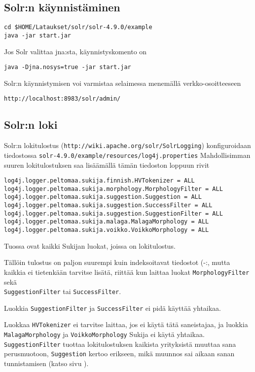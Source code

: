 \documentclass[12pt,a4paper]{scrartcl}
\begin{document}
\subsection*{Solr:n käynnistäminen}

\begin{verbatim}
cd $HOME/Lataukset/solr/solr-4.9.0/example
java -jar start.jar
\end{verbatim}

Jos Solr valittaa jna:sta, käynnistyskomento on

\begin{verbatim}
java -Djna.nosys=true -jar start.jar
\end{verbatim}

Solr:n käynnistymisen voi varmistaa selaimessa menemällä verkko-osoitteeseen

\verb|http://localhost:8983/solr/admin/|


\subsection*{Solr:n loki}

Solr:n lokitulostus (\verb=http://wiki.apache.org/solr/SolrLogging=)
konfiguroidaan tiedostossa
\verb=solr-4.9.0/example/resources/log4j.properties=
Mahdollisimman suuren lokitulostuksen saa lisäämällä tämän tiedoston
loppuun rivit

\begin{verbatim}
log4j.logger.peltomaa.sukija.finnish.HVTokenizer = ALL
log4j.logger.peltomaa.sukija.morphology.MorphologyFilter = ALL
log4j.logger.peltomaa.sukija.suggestion.Suggestion = ALL
log4j.logger.peltomaa.sukija.suggestion.SuccessFilter = ALL
log4j.logger.peltomaa.sukija.suggestion.SuggestionFilter = ALL
log4j.logger.peltomaa.sukija.malaga.MalagaMorphology = ALL
log4j.logger.peltomaa.sukija.voikko.VoikkoMorphology = ALL
\end{verbatim}

Tuossa ovat kaikki Sukijan luokat, joissa on lokitulostus.

Tällöin tulostus on paljon suurempi kuin indeksoitavat tiedostot (-:,
mutta kaikkia ei tietenkään tarvitse lisätä, riittää kun laittaa
luokat \verb=MorphologyFilter= sekä \\
\verb=SuggestionFilter= tai \verb=SuccessFilter=.

Luokkia \verb=SuggestionFilter= ja \verb=SuccessFilter= ei pidä
käyttää yhtaikaa.

Luokkaa \verb=HVTokenizer= ei tarvitse laittaa, jos ei käytä tätä
saneistajaa, ja luokkia \\
\verb=MalagaMorphology= ja \verb=VoikkoMorphology= Sukija ei käytä
yhtaikaa. \verb=SuggestionFilter= tuottaa lokitulostuksen kaikista
yrityksistä muuttaa sana perusmuotoon, \verb=Suggestion= kertoo
erikseen, mikä muunnos sai aikaan sanan tunnistamisen (katso sivu
).
\end{document}
